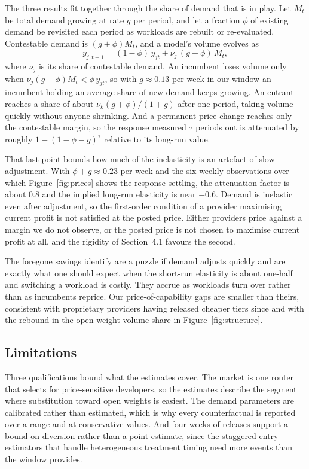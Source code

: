 \documentclass{article}
\begin{document}
The three results fit together through the share of demand that is in play. Let $M_t$ be
total demand growing at rate $g$ per period, and let a fraction $\phi$ of existing demand be
revisited each period as workloads are rebuilt or re-evaluated. Contestable demand is
$(g + \phi) M_t$, and a model's volume evolves as
\begin{equation}
y_{j,t+1} = (1 - \phi)\, y_{jt} + \nu_j \,(g + \phi)\, M_t ,
\label{eq:accounting}
\end{equation}
where $\nu_j$ is its share of contestable demand. An incumbent loses volume only when
$\nu_j (g+\phi) M_t < \phi\, y_{jt}$, so with $g \approx 0.13$ per week in our window an
incumbent holding an average share of new demand keeps growing. An entrant reaches a share of
about $\nu_k (g+\phi)/(1+g)$ after one period, taking volume quickly without anyone
shrinking. And a permanent price change reaches only the contestable margin, so the response
measured $\tau$ periods out is attenuated by roughly $1 - (1-\phi-g)^{\tau}$ relative to
its long-run value.

That last point bounds how much of the inelasticity is an artefact of slow adjustment. With
$\phi + g \approx 0.23$ per week and the six weekly observations over which
Figure~\ref{fig:prices} shows the response settling, the attenuation factor is about 0.8 and
the implied long-run elasticity is near $-0.6$. Demand is inelastic even after adjustment, so
the first-order condition of a provider maximising current profit is not satisfied at the
posted price. Either providers price against a margin we do not observe, or the posted price
is not chosen to maximise current profit at all, and the rigidity of Section~4.1 favours the
second.

The foregone savings \citet{nagle2025} identify are a puzzle if demand adjusts quickly and
are exactly what one should expect when the short-run elasticity is about one-half and
switching a workload is costly. They accrue as workloads turn over rather than as incumbents
reprice. Our price-of-capability gaps are smaller than theirs, consistent with proprietary
providers having released cheaper tiers since and with the rebound in the open-weight volume
share in Figure~\ref{fig:structure}.

\subsection{Limitations}

Three qualifications bound what the estimates cover. The market is one router that selects
for price-sensitive developers, so the estimates describe the segment where substitution
toward open weights is easiest. The demand parameters are calibrated rather than estimated,
which is why every counterfactual is reported over a range and at conservative values. And
four weeks of releases support a bound on diversion rather than a point estimate, since the
staggered-entry estimators that handle heterogeneous treatment timing
\citep{callaway2021,dechaisemartin2020,sun2021,borusyak2024} need more events than the window
provides.
\end{document}
